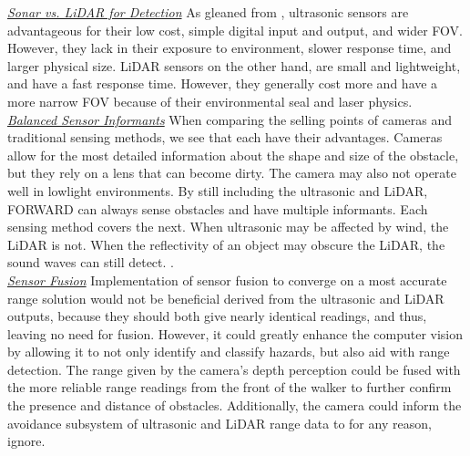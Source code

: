 \noindent \underline{\textit{Sonar vs. LiDAR for Detection}} As gleaned from \cite{sonar-vs-lidar}, ultrasonic sensors are advantageous for their low cost, simple digital input and output, and wider FOV. However, they lack in their exposure to environment, slower response time, and larger physical size. LiDAR sensors on the other hand, are small and lightweight, and have a fast response time. However, they generally cost more and have a more narrow FOV because of their environmental seal and laser physics.\\

\noindent \underline{\textit{Balanced Sensor Informants}} When comparing the selling points of cameras and traditional sensing methods, we see that each have their advantages. Cameras allow for the most detailed information about the shape and size of the obstacle, but they rely on a lens that can become dirty. The camera may also not operate well in lowlight environments. By still including the ultrasonic and LiDAR, FORWARD can always sense obstacles and have multiple informants. Each sensing method covers the next. When ultrasonic may be affected by wind, the LiDAR is not. When the reflectivity of an object may obscure the LiDAR, the sound waves can still detect. \cite{camera-vs-sensor}.\\

\noindent \underline{\textit{Sensor Fusion}} Implementation of sensor fusion to converge on a most accurate range solution would not be beneficial derived from the ultrasonic and LiDAR outputs, because they should both give nearly identical readings, and thus, leaving no need for fusion. However, it could greatly enhance the computer vision by allowing it to not only identify and classify hazards, but also aid with range detection. The range given by the camera's depth perception could be fused with the more reliable range readings from the front of the walker to further confirm the presence and distance of obstacles. Additionally, the camera could inform the avoidance subsystem of ultrasonic and LiDAR range data to for any reason, ignore.\\




